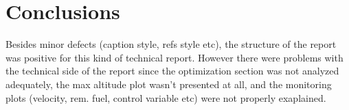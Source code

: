 \section{Conclusions}%

Besides minor defects (caption style, refs style etc), the structure of the report was 
positive for this kind of technical report. However there were problems with the technical side of the report since
the optimization section was not analyzed adequately, the max altitude plot wasn't presented at all, and the monitoring plots (velocity, rem. fuel, 
control variable etc) were not properly exaplained. 
